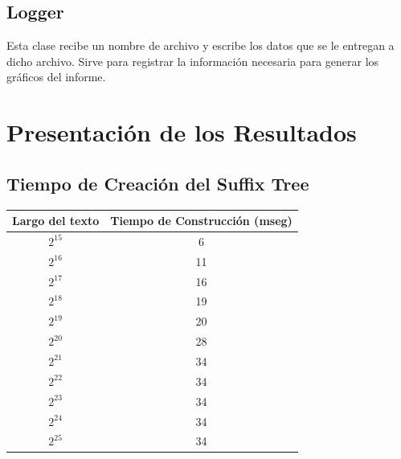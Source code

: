 \documentclass[letterpaper,10pt]{article}
\begin{document}
	\subsection{Logger}

	Esta clase recibe un nombre de archivo y escribe los datos que se le entregan a dicho archivo. Sirve para registrar la información necesaria para generar los gráficos del informe.

	\newpage

	\section{Presentación de los Resultados}

	\subsection{Tiempo de Creación del Suffix Tree}


	\begin{center}
		\begin{tabular}{|c|c|}
			\hline
			Largo del texto & Tiempo de Construcción (mseg)\\
			\hline
			$2^{15}$ & 6\\
			\hline
			$2^{16}$ & 11\\
			\hline
			$2^{17}$ & 16\\
			\hline
			$2^{18}$ & 19\\
			\hline
			$2^{19}$ & 20\\
			\hline
			$2^{20}$ & 28\\
			\hline
			$2^{21}$ & 34\\
			\hline
			$2^{22}$ & 34\\
			\hline
			$2^{23}$ & 34\\
			\hline
			$2^{24}$ & 34\\
			\hline
			$2^{25}$ & 34\\
			\hline
		\end{tabular}
	\end{center}
\end{document}

